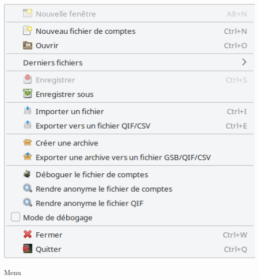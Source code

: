 \begin{minipage}{.3\linewidth}
	\vspace{-10pt}					%
	\centering						%
	\includegraphics[width=1\textwidth]{image/screenshot/home_menubar_file}
	\vspace{-10pt}					%
	\captionsetup{
		type=figure,%
		name=Fig.,%
		labelsep=newline}			%
	\caption{Menu }	%
	\label{home_menubar_file}
\end{minipage}

